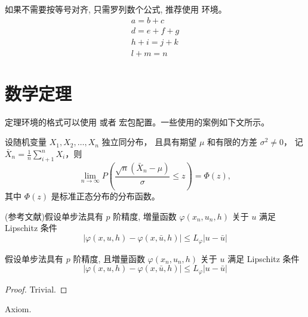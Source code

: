 \documentclass[report, twoside, UTF8, AutoFakeBold = 1, AutoFakeSlant, zihao = -4]{config}
\begin{document}
如果不需要按等号对齐, 只需罗列数个公式, 推荐使用  环境。
\begin{gather}
a = b + c \\
d = e + f + g \\
h + i = j + k \\
l + m = n
\end{gather}

\section{数学定理}

定理环境的格式可以使用  或者  宏包配置。一些使用的案例如下文所示。

\begin{theorem}
    设随机变量 $X_1, X_2, \dots, X_n$ 独立同分布， 且具有期望 $\mu$ 和有限的方差 $\sigma^2 \ne 0$，
    记 $\bar{X}_n = \frac{1}{n} \sum_{i+1}^n X_i$，则
    \begin{equation}
        \lim_{n \to \infty} P \left(\frac{\sqrt{n} \left( \bar{X}_n - \mu \right)}{\sigma} \le z \right) = \Phi(z),
    \end{equation}
    其中 $\Phi(z)$ 是标准正态分布的分布函数。
\end{theorem}

\begin{lemma}\label{lemma-convergence} 
    (参考文献\cite{aaas1883science})假设单步法具有 $p$ 阶精度, 増量函数 $\varphi(x_{n}, u_{n}, h)$ 关于 $u$ 满足 {\rm Lipschitz} 条件
    \begin{equation}\label{eqn:3}
        |\varphi(x, u, h)-\varphi(x, \bar{u}, h)| \leqslant L_{\varphi}|u-\bar{u}|
    \end{equation}
\end{lemma}

\begin{corollary}\label{col-convergence}
    假设单步法具有 $p$ 阶精度, 且増量函数 $\varphi(x_{n}, u_{n}, h)$ 关于 $u$ 满足 {\rm Lipschitz} 条件
    \begin{equation}\label{eqn:5}
        |\varphi(x, u, h)-\varphi(x, \bar{u}, h)| \leqslant L_{\varphi}|u-\bar{u}|
    \end{equation}
\end{corollary}

\begin{proof}\label{proof1}
    Trivial. \QED
\end{proof}

\begin{axiom}\label{axiom1}
    Axiom.
\end{axiom}
\end{document}
